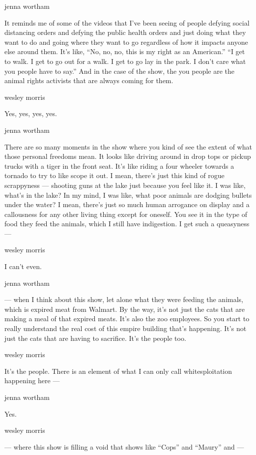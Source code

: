 jenna wortham

It reminds me of some of the videos that I've been seeing of people
defying social distancing orders and defying the public health orders
and just doing what they want to do and going where they want to go
regardless of how it impacts anyone else around them. It's like, ``No,
no, no, this is my right as an American.'' ``I get to walk. I get to go
out for a walk. I get to go lay in the park. I don't care what you
people have to say.'' And in the case of the show, the you people are
the animal rights activists that are always coming for them.

wesley morris

Yes, yes, yes, yes.

jenna wortham

There are so many moments in the show where you kind of see the extent
of what those personal freedoms mean. It looks like driving around in
drop tops or pickup trucks with a tiger in the front seat. It's like
riding a four wheeler towards a tornado to try to like scope it out. I
mean, there's just this kind of rogue scrappyness --- shooting guns at
the lake just because you feel like it. I was like, what's in the lake?
In my mind, I was like, what poor animals are dodging bullets under the
water? I mean, there's just so much human arrogance on display and a
callousness for any other living thing except for oneself. You see it in
the type of food they feed the animals, which I still have indigestion.
I get such a queasyness ---

wesley morris

I can't even.

jenna wortham

--- when I think about this show, let alone what they were feeding the
animals, which is expired meat from Walmart. By the way, it's not just
the cats that are making a meal of that expired meats. It's also the zoo
employees. So you start to really understand the real cost of this
empire building that's happening. It's not just the cats that are having
to sacrifice. It's the people too.

wesley morris

It's the people. There is an element of what I can only call
whitesploitation happening here ---

jenna wortham

Yes.

wesley morris

--- where this show is filling a void that shows like ``Cops'' and
``Maury'' and ---

